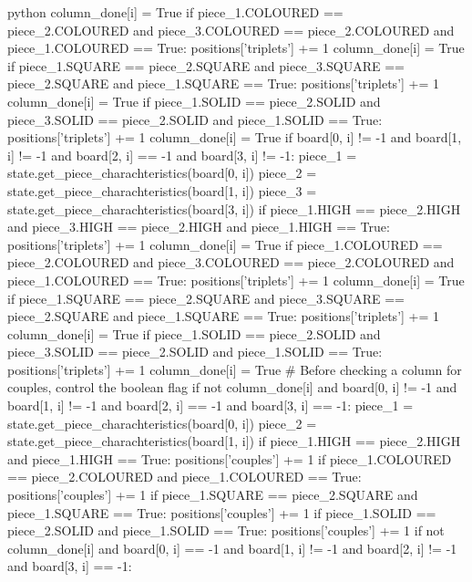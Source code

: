 \begin{mintedbox}{python}
                column_done[i] = True
            if piece_1.COLOURED == piece_2.COLOURED and piece_3.COLOURED == piece_2.COLOURED and piece_1.COLOURED == True:
                positions['triplets'] += 1
                column_done[i] = True
            if piece_1.SQUARE == piece_2.SQUARE and piece_3.SQUARE == piece_2.SQUARE and piece_1.SQUARE == True:
                positions['triplets'] += 1
                column_done[i] = True
            if piece_1.SOLID == piece_2.SOLID and piece_3.SOLID == piece_2.SOLID and piece_1.SOLID == True:
                positions['triplets'] += 1
                column_done[i] = True
        if board[0, i] != -1 and board[1, i] != -1 and board[2, i] == -1 and board[3, i] != -1:
            piece_1 = state.get_piece_charachteristics(board[0, i])
            piece_2 = state.get_piece_charachteristics(board[1, i])
            piece_3 = state.get_piece_charachteristics(board[3, i])
            if piece_1.HIGH == piece_2.HIGH and piece_3.HIGH == piece_2.HIGH and piece_1.HIGH == True:
                positions['triplets'] += 1
                column_done[i] = True
            if piece_1.COLOURED == piece_2.COLOURED and piece_3.COLOURED == piece_2.COLOURED and piece_1.COLOURED == True:
                positions['triplets'] += 1
                column_done[i] = True
            if piece_1.SQUARE == piece_2.SQUARE and piece_3.SQUARE == piece_2.SQUARE and piece_1.SQUARE == True:
                positions['triplets'] += 1
                column_done[i] = True
            if piece_1.SOLID == piece_2.SOLID and piece_3.SOLID == piece_2.SOLID and piece_1.SOLID == True:
                positions['triplets'] += 1
                column_done[i] = True
        # Before checking a column for couples, control the boolean flag
        if not column_done[i] and board[0, i] != -1 and board[1, i] != -1 and board[2, i] == -1 and board[3, i] == -1:
            piece_1 = state.get_piece_charachteristics(board[0, i])
            piece_2 = state.get_piece_charachteristics(board[1, i])
            if piece_1.HIGH == piece_2.HIGH and piece_1.HIGH == True:
                positions['couples'] += 1
            if piece_1.COLOURED == piece_2.COLOURED and piece_1.COLOURED == True:
                positions['couples'] += 1
            if piece_1.SQUARE == piece_2.SQUARE and piece_1.SQUARE == True:
                positions['couples'] += 1
            if piece_1.SOLID == piece_2.SOLID and piece_1.SOLID == True:
                positions['couples'] += 1
        if not column_done[i] and board[0, i] == -1 and board[1, i] != -1 and board[2, i] != -1 and board[3, i] == -1:

\end{mintedbox}
